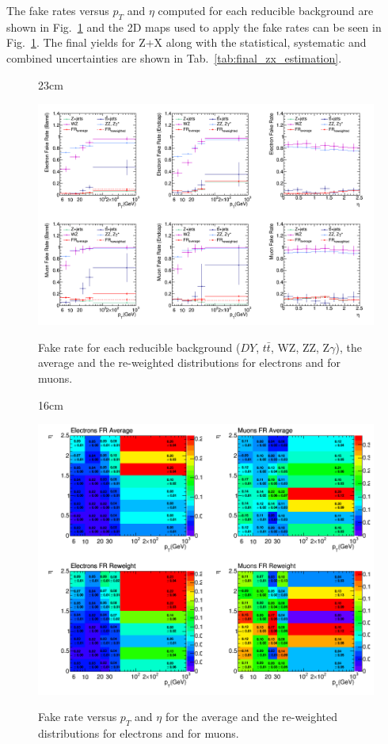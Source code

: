 The fake rates versus $p_{T}$ and $\eta$ computed for each reducible background are shown in Fig.~\ref{fig:fr_pt_eta_1D_systematics} and the 2D maps used to apply the fake rates can be seen in Fig.~\ref{fig:fr_pt_eta_1D_systematics}. The final yields for Z+X along with the statistical, systematic and combined uncertainties are shown in Tab.~\ref{tab:final_zx_estimation}.

\begin{landscape}
\begin{figure}[htbp]{23cm}
	\caption{Fake rate for each reducible background ($DY$, $t\bar{t}$, WZ, ZZ, Z$\gamma$), the average and the re-weighted distributions for electrons and for muons.}
	\centering
	\includegraphics[scale=0.5]{ChapterAnalysis/figs/fake_rate_1D_pt_eta_for_systematics}
	\label{fig:fr_pt_eta_1D_systematics}
\end{figure}
\end{landscape}

\begin{figure}[htbp]{16cm}
	\caption{Fake rate versus $p_{T}$ and $\eta$ for the average and the re-weighted distributions for electrons and for muons.}
	\centering
	\includegraphics[scale=0.5]{ChapterAnalysis/figs/fake_rate_2D_maps_for_systematics}
	\label{fig:fr_pt_eta_2D_systematics}
\end{figure}


